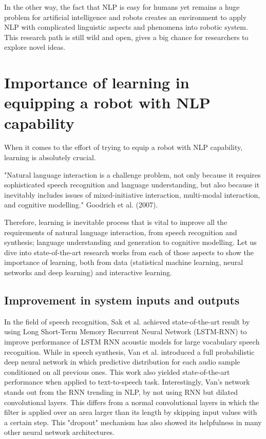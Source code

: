 \documentclass[10pt, a4paper]{article}
\begin{document}
In the other way, the fact that NLP is easy for humans yet remains a huge problem for artificial intelligence and robots creates an environment to apply NLP with complicated linguistic aspects and phenomena into robotic system. This research path is still wild and open, gives a big chance for researchers to explore novel ideas.

\section{Importance of learning in equipping a robot with NLP capability}
When it comes to the effort of trying to equip a robot with NLP capability, learning is absolutely crucial.

\begin{displayquote}
"Natural language interaction is a challenge problem, not only because it requires sophisticated speech recognition and language understanding, but also because it inevitably includes issues of mixed-initiative interaction, multi-modal interaction, and cognitive modelling." Goodrich et al. (2007)\cite{goodrich2007human}.
\end{displayquote}

Therefore, learning is inevitable process that is vital to improve all the requirements of natural language interaction, from speech recognition and synthesis; language understanding and generation to cognitive modelling. Let us dive into state-of-the-art research works from each of those aspects to show the importance of learning, both from data (statistical machine learning, neural networks and deep learning) and interactive learning.

\subsection{Improvement in system inputs and outputs}
In the field of speech recognition, Sak et al. \cite{sak2015fast} achieved state-of-the-art result by using Long Short-Term Memory Recurrent Neural Network (LSTM-RNN) to improve performance of LSTM RNN acoustic models for large vocabulary speech recognition. While in speech synthesis, Van et al.\cite{van2016wavenet} introduced a full probabilistic deep neural network in which predictive distribution for each audio sample conditioned on all previous ones. This work also yielded state-of-the-art performance when applied to text-to-speech task. Interestingly, Van's network stands out from the RNN trending in NLP, by not using RNN but dilated convolutional layers. This differs from a normal convolutional layers in which the filter is applied over an area larger than its length by skipping input values with a certain step. This "dropout" mechanism has also showed its helpfulness in many other neural network architectures.
\end{document}
